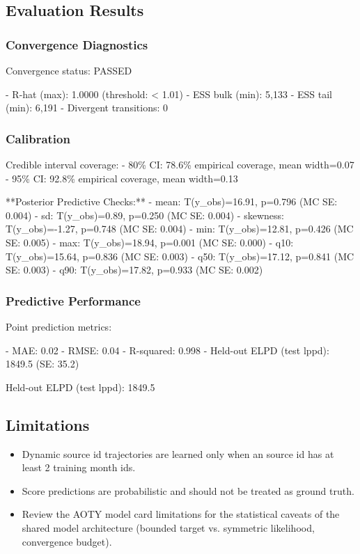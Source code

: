 \documentclass{article}
\begin{document}
\subsection*{Evaluation Results}

\subsubsection*{Convergence Diagnostics}
Convergence status: PASSED

- R-hat (max): 1.0000 (threshold: < 1.01)
- ESS bulk (min): 5,133
- ESS tail (min): 6,191
- Divergent transitions: 0

\subsubsection*{Calibration}
Credible interval coverage:
- 80\% CI: 78.6\% empirical coverage, mean width=0.07
- 95\% CI: 92.8\% empirical coverage, mean width=0.13

**Posterior Predictive Checks:**
- mean: T(y\_obs)=16.91, p=0.796 (MC SE: 0.004)
- sd: T(y\_obs)=0.89, p=0.250 (MC SE: 0.004)
- skewness: T(y\_obs)=-1.27, p=0.748 (MC SE: 0.004)
- min: T(y\_obs)=12.81, p=0.426 (MC SE: 0.005)
- max: T(y\_obs)=18.94, p=0.001 (MC SE: 0.000)
- q10: T(y\_obs)=15.64, p=0.836 (MC SE: 0.003)
- q50: T(y\_obs)=17.12, p=0.841 (MC SE: 0.003)
- q90: T(y\_obs)=17.82, p=0.933 (MC SE: 0.002)

\subsubsection*{Predictive Performance}
Point prediction metrics:

- MAE: 0.02
- RMSE: 0.04
- R-squared: 0.998
- Held-out ELPD (test lppd): 1849.5 (SE: 35.2)

Held-out ELPD (test lppd): 1849.5

\subsection*{Limitations}
\begin{itemize}
  \item Dynamic source id trajectories are learned only when an source id has at least 2 training month ids.
  \item Score predictions are probabilistic and should not be treated as ground truth.
  \item Review the AOTY model card limitations for the statistical caveats of the shared model architecture (bounded target vs. symmetric likelihood, convergence budget).
\end{itemize}
\end{document}
